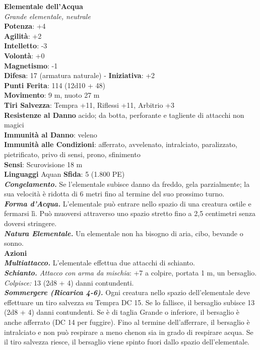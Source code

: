 \begin{multicols}{2}
\medskip\textbf{Elementale dell'Acqua}\\
\emph{Grande elementale, neutrale}\\
\textbf{Potenza}: +4\\
\textbf{Agilità}: +2\\
\textbf{Intelletto}: -3\\
\textbf{Volontà}: +0\\
\textbf{Magnetismo}: -1\\
\textbf{Difesa}: 17 (armatura naturale) - \textbf{Iniziativa}: +2\\
\textbf{Punti Ferita}: 114 (12d10 + 48)\\
\textbf{Movimento}: 9 m, nuoto 27 m\\
\textbf{Tiri Salvezza}: Tempra +11, Riflessi +11, Arbitrio +3\\
\textbf{Resistenze al Danno} acido; da botta, perforante e tagliente di attacchi non magici\\
\textbf{Immunità al Danno}: veleno\\
\textbf{Immunità alle Condizioni}: afferrato, avvelenato, intralciato, paralizzato, pietrificato, privo di sensi, prono, sfinimento\\
\textbf{Sensi}: Scurovisione 18 m\\
\textbf{Linguaggi} Aquan
\textbf{Sfida}: 5 (1.800 PE)\smallskip\\
\emph{\textbf{Congelamento.}} Se l'elementale subisce danno da freddo, gela parzialmente; la sua velocità è ridotta di 6 metri fino al termine del suo prossimo turno.\\
\emph{\textbf{Forma d'Acqua.}} L'elementale può entrare nello spazio di una creatura ostile e fermarsi lì. Può muoversi attraverso uno spazio stretto fino a 2,5 centimetri senza doversi stringere.\\
\emph{\textbf{Natura Elementale.}} Un elementale non ha bisogno di aria, cibo, bevande o sonno.\\
\smallskip\textbf{Azioni}\\
\emph{\textbf{Multiattacco.}} L'elementale effettua due attacchi di schianto.\\
\emph{\textbf{Schianto.} Attacco con arma da mischia}: +7 a colpire, portata 1 m, un bersaglio.\\
\emph{Colpisce:} 13 (2d8 + 4) danni contundenti.\\
\emph{\textbf{Sommergere (Ricarica 4-6).}} Ogni creatura nello spazio dell'elementale deve effettuare un tiro salvezza su Tempra DC 15. Se lo fallisce, il bersaglio subisce 13 (2d8 + 4) danni contundenti. Se è di taglia Grande o inferiore, il bersaglio è anche afferrato (DC 14 per fuggire). Fino al termine dell'afferrare, il bersaglio è intralciato e non può respirare a meno chenon sia in grado di respirare acqua. Se il  tiro salvezza riesce, il bersaglio viene spinto fuori dallo spazio dell'elementale.\\

\end{multicols}

